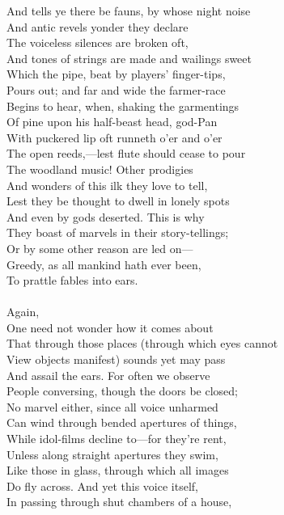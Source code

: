 And tells ye there be fauns, by whose night noise\\
And antic revels yonder they declare\\
The voiceless silences are broken oft,\\
And tones of strings are made and wailings sweet\\
Which the pipe, beat by players' finger-tips,\\
Pours out; and far and wide the farmer-race\\
Begins to hear, when, shaking the garmentings\\
Of pine upon his half-beast head, god-Pan\\
With puckered lip oft runneth o'er and o'er\\
The open reeds,—lest flute should cease to pour\\
The woodland music! Other prodigies\\
And wonders of this ilk they love to tell,\\
Lest they be thought to dwell in lonely spots\\
And even by gods deserted. This is why\\
They boast of marvels in their story-tellings;\\
Or by some other reason are led on—\\
Greedy, as all mankind hath ever been,\\
To prattle fables into ears.\\
\\
Again,\\
One need not wonder how it comes about\\
That through those places (through which eyes cannot\\
View objects manifest) sounds yet may pass\\
And assail the ears. For often we observe\\
People conversing, though the doors be closed;\\
No marvel either, since all voice unharmed\\
Can wind through bended apertures of things,\\
While idol-films decline to—for they're rent,\\
Unless along straight apertures they swim,\\
Like those in glass, through which all images\\
Do fly across. And yet this voice itself,\\
In passing through shut chambers of a house,\\
